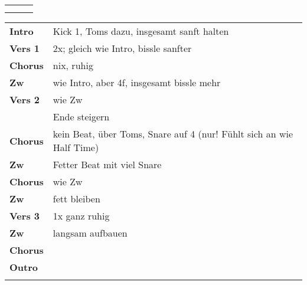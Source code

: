 

\begin{tabular}{p{0.6cm}p{12cm}p{1.4cm}}
	\rowcolor{cyan} \myRow{\thesongnumber} & \myRow{Cornerstone} & \myRow{72} \\
	                                       &                     &            \\
\end{tabular}

\begin{tabular}{p{1.6cm}l}
	\textbf{Intro}  & Kick 1, Toms dazu, insgesamt sanft halten                            \\
	\textbf{Vers 1} & 2x; gleich wie Intro, bissle sanfter                                 \\
	\textbf{Chorus} & nix, ruhig                                                           \\
	\textbf{Zw}     & wie Intro, aber 4f, insgesamt bissle mehr                            \\
	\textbf{Vers 2} & wie Zw                                                               \\
	                & Ende steigern                                                        \\
	\textbf{Chorus} & kein Beat, über Toms, Snare auf 4 (nur! Fühlt sich an wie Half Time) \\
	\textbf{Zw}     & Fetter Beat mit viel Snare                                           \\
	\textbf{Chorus} & wie Zw                                                               \\
	\textbf{Zw}     & fett bleiben                                                         \\
	\textbf{Vers 3} & 1x ganz ruhig                                                        \\
	\textbf{Zw}     & langsam aufbauen                                                     \\
	\textbf{Chorus} &                                                                      \\
	\textbf{Outro}  &                                                                      \\
	                &                                                                      \\
\end{tabular}
